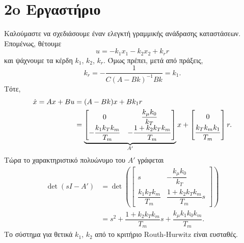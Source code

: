 \documentclass[12pt]{article}
\begin{document}
\section*{2o Εργαστήριο}
Καλούμαστε να σχεδιάσουμε έναν ελεγκτή γραμμικής ανάδρασης καταστάσεων. Επομένως, θέτουμε
\[
    u = -k_1 x_1 - k_2 x_2 + k_r r
\] και ψάχνουμε τα κέρδη \(k_1\), \(k_2\), \(k_r\). Όμως πρέπει, μετά από πράξεις,
\begin{equation*}
    k_r = -\dfrac{1}{C(A-Bk)^{-1} Bk} = k_1.
\end{equation*}
Τότε,
\begin{align*}
    \dot{x} = Ax + Bu &= (A - Bk)x + Bk_1 r \\
            &= \underbrace{\begin{bmatrix}
                0 & \dfrac{k_\mu k_0}{k_T } \\
                -\dfrac{k_1 k_T k_m }{T_m } & -\dfrac{1 + k_2 k_T k_m }{T_m }
            \end{bmatrix}}_{A'} x + \begin{bmatrix}
                0\vphantom{\dfrac{0}{k_1}} \\
                \dfrac{k_T k_m k_1 }{T_m }
            \end{bmatrix} r .
\end{align*} 
Τώρα το χαρακτηριστικό πολυώνυμο του $A'$ γράφεται 
\begin{align*}
    \det(sI - A') &= \det\left(\begin{bmatrix}
        s & -\dfrac{k_\mu k_0}{k_T } \\
        \dfrac{k_1 k_T k_m }{T_m } & \dfrac{1 + k_2 k_T k_m }{T_m } s 
    \end{bmatrix}\right) \\
    &= s^2 + \dfrac{1 + k_2 k_T k_m }{T_m }s + \dfrac{k_\mu k_1 k_0 k_m}{T_m}.
\end{align*}
Το σύστημα για θετικά \(k_1\), \(k_2\) από το κριτήριο Routh-Hurwitz είναι ευσταθές. 
\end{document}
